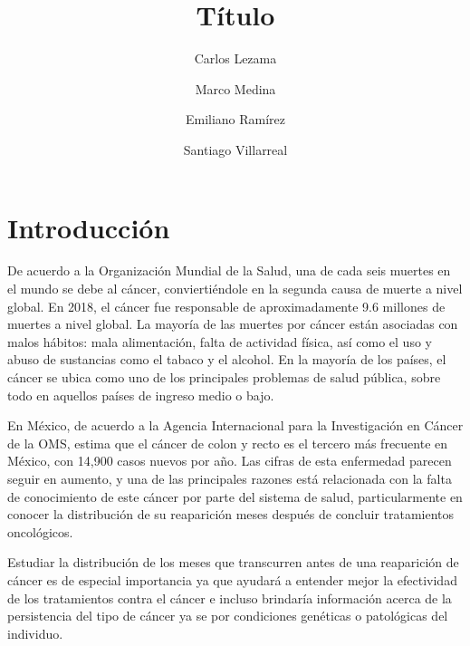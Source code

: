 \documentclass[9pt,twocolumn,twoside,]{pnas-new}
\title{Título}
\author[a,1,2]{Carlos Lezama}
\author[a,1,2]{Marco Medina}
\author[a,1,2]{Emiliano Ramírez}
\author[a,1,2]{Santiago Villarreal}
\affil[a]{Instituto Tecnológico Autónomo de México}
\begin{document}
\verticaladjustment{-2pt}

\maketitle
\thispagestyle{firststyle}


\acknow{}

\hypertarget{introducciuxf3n}{%
\section*{Introducción}\label{introducciuxf3n}}

De acuerdo a la Organización Mundial de la Salud, una de cada seis
muertes en el mundo se debe al cáncer, conviertiéndole en la segunda
causa de muerte a nivel global. En 2018, el cáncer fue responsable de
aproximadamente 9.6 millones de muertes a nivel global. La mayoría de
las muertes por cáncer están asociadas con malos hábitos: mala
alimentación, falta de actividad física, así como el uso y abuso de
sustancias como el tabaco y el alcohol. En la mayoría de los países, el
cáncer se ubica como uno de los principales problemas de salud pública,
sobre todo en aquellos países de ingreso medio o bajo.

En México, de acuerdo a la Agencia Internacional para la Investigación
en Cáncer de la OMS, estima que el cáncer de colon y recto es el tercero
más frecuente en México, con 14,900 casos nuevos por año. Las cifras de
esta enfermedad parecen seguir en aumento, y una de las principales
razones está relacionada con la falta de conocimiento de este cáncer por
parte del sistema de salud, particularmente en conocer la distribución
de su reaparición meses después de concluir tratamientos oncológicos.

Estudiar la distribución de los meses que transcurren antes de una
reaparición de cáncer es de especial importancia ya que ayudará a
entender mejor la efectividad de los tratamientos contra el cáncer e
incluso brindaría información acerca de la persistencia del tipo de
cáncer ya se por condiciones genéticas o patológicas del individuo.
\end{document}
